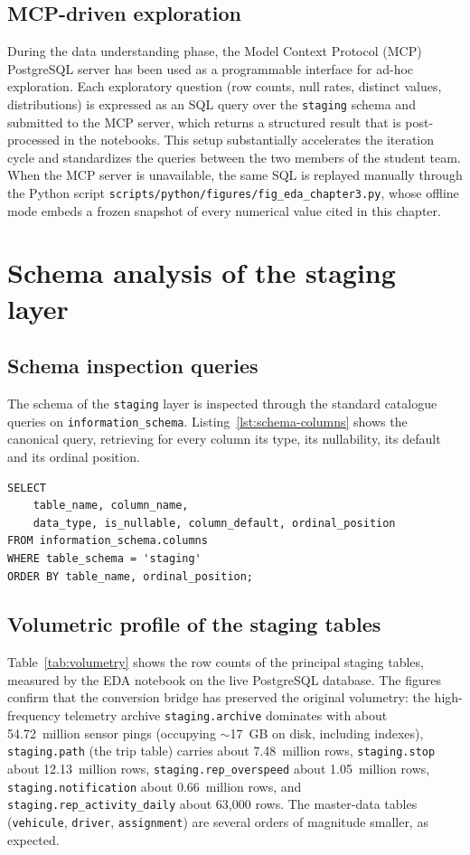 \subsection{MCP-driven exploration}
During the data understanding phase, the Model Context Protocol (MCP) PostgreSQL server has been used as a programmable interface for ad-hoc exploration. Each exploratory question (row counts, null rates, distinct values, distributions) is expressed as an SQL query over the \texttt{staging} schema and submitted to the MCP server, which returns a structured result that is post-processed in the notebooks. This setup substantially accelerates the iteration cycle and standardizes the queries between the two members of the student team. When the MCP server is unavailable, the same SQL is replayed manually through the Python script \texttt{scripts/python/figures/fig\_eda\_chapter3.py}, whose offline mode embeds a frozen snapshot of every numerical value cited in this chapter.

\section{Schema analysis of the staging layer}

\subsection{Schema inspection queries}
The schema of the \texttt{staging} layer is inspected through the standard catalogue queries on \texttt{information\_schema}. Listing~\ref{lst:schema-columns} shows the canonical query, retrieving for every column its type, its nullability, its default and its ordinal position.

\begin{lstlisting}[style=sql,caption={Schema inspection query against \texttt{information\_schema}, restricted to the \texttt{staging} schema.},label={lst:schema-columns}]
SELECT
    table_name, column_name,
    data_type, is_nullable, column_default, ordinal_position
FROM information_schema.columns
WHERE table_schema = 'staging'
ORDER BY table_name, ordinal_position;
\end{lstlisting}

\subsection{Volumetric profile of the staging tables}
Table~\ref{tab:volumetry} shows the row counts of the principal staging tables, measured by the EDA notebook on the live PostgreSQL database. The figures confirm that the conversion bridge has preserved the original volumetry: the high-frequency telemetry archive \texttt{staging.archive} dominates with about 54.72~million sensor pings (occupying $\sim$17~GB on disk, including indexes), \texttt{staging.path} (the trip table) carries about 7.48~million rows, \texttt{staging.stop} about 12.13~million rows, \texttt{staging.rep\_overspeed} about 1.05~million rows, \texttt{staging.notification} about 0.66~million rows, and \texttt{staging.rep\_activity\_daily} about 63{,}000 rows. The master-data tables (\texttt{vehicule}, \texttt{driver}, \texttt{assignment}) are several orders of magnitude smaller, as expected.

